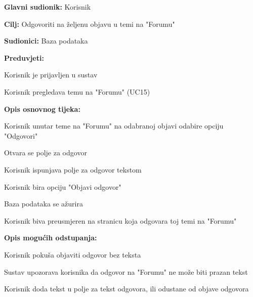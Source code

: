 					\noindent {}
					\begin{packed_item}
	
						\item \textbf{Glavni sudionik: }Korisnik
						\item  \textbf{Cilj:} Odgovoriti na željenu objavu u temi na "Forumu"
						\item  \textbf{Sudionici:} Baza podataka
						\item  \textbf{Preduvjeti:}
						\item[] \begin{packed_enum}
							\item Korisnik je prijavljen u sustav
							\item Korisnik pregledava temu na "Forumu" (UC15)
						\end{packed_enum}
						\item  \textbf{Opis osnovnog tijeka:}
						
						\item[] \begin{packed_enum}
	
							\item Korisnik unutar teme na "Forumu" na odabranoj objavi odabire opciju "Odgovori"
							\item Otvara se polje za odgovor
							\item Korisnik ispunjava polje za odgovor tekstom
							\item Korisnik bira opciju "Objavi odgovor"
							\item Baza podataka se ažurira
							\item Korisnik biva preusmjeren na stranicu koja odgovara toj temi na "Forumu"
							
							
						\end{packed_enum}
						
						\item  \textbf{Opis mogućih odstupanja:}
						
						\item[] \begin{packed_item}
						\item[3.a] Korisnik pokuša objaviti odgovor bez teksta
							\item[] \begin{packed_enum}
								
								\item Sustav upozorava korisnika da odgovor na "Forumu" ne može biti prazan tekst
								\item Korisnik doda tekst u polje za tekst odgovora, ili odustane od objave odgovora
								
							\end{packed_enum}
						
						
					\end{packed_item}
					\end{packed_item}
